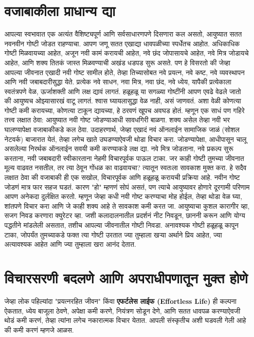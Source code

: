  \chapter{वजाबाकीला प्राधान्य द्या}
आपल्या स्वभावात एक अत्यंत वैशिष्ट्यपूर्ण आणि सर्वसाधारणपणे दिसणारा कल असतो, आयुष्यात सतत नवनवीन गोष्टी जोडत राहण्याचा.
 आपण जणू सतत एखाद्या धावपळीच्या स्पर्धेतच आहोत. अधिकाधिक गोष्टी मिळवायच्या आहेत, अजून नवी कामं करायची आहेत, नवे छंद जोपासायचे आहेत, नवे मित्र जोडायचे आहेत, आणि शक्य तितकं जास्त मिळवण्याची अखंड धडपड सुरू असते.
पण हे विसरतो की जेव्हा आपल्या जीवनात एखादी नवी गोष्ट सामील होते, तेव्हा तिच्यासोबत नवे प्रयत्न, नवे कष्ट, नवे व्यवस्थापन आणि नवी जबाबदारीसुद्धा येते.
 प्रत्येक नवे साधन, नवा मित्र, नवा छंद, नवे ध्येय, यापैकी प्रत्येकाला स्वतंत्रपणे वेळ, ऊर्जाशक्ती आणि लक्ष द्यावं लागतं. हळूहळू या सगळ्या गोष्टींनी आपण एवढे वेढले जातो की आयुष्यच ओझ्यासारखं वाटू लागतं.
 श्वास घ्यायलासुद्धा वेळ नाही, असं जाणवतं. अशा वेळी कोणत्या गोष्टी कमी करायच्या, कोणत्या टाकून द्यायच्या, हे ठरवणं खूपच अवघड होतं.
म्हणून एक साधं पण गहिरे तत्त्व लक्षात ठेवा: आयुष्यात नवी गोष्ट जोडण्याआधी सावधगिरी बाळगा. शक्य असेल तेव्हा नवी भर घालण्यापेक्षा वजाबाकीकडे कल ठेवा.
उदाहरणार्थ, जेव्हा एखादं नवं ऑनलाईन सामाजिक जाळं (सोशल नेटवर्क) बाजारात येतं, तेव्हा लगेच खाते उघडण्याऐवजी थोडा विचार करा.
 जोडण्यापेक्षा, आधीपासून चालू असलेल्या निरर्थक ऑनलाईन सवयी कमी करण्याकडे लक्ष द्या.
नवे मित्र जोडताना, नवे प्रकल्प सुरू करताना, नवी जबाबदारी स्वीकारताना नेहमी विचारपूर्वक पाऊल टाका.
 जर काही गोष्टी तुमच्या जीवनात मूल्य वाढवत नसतील, तर त्या ठेवून गोंधळ का वाढवायचा? त्यातून स्वतःला सावकाश मुक्त करा.
हे सदैव लक्षात ठेवा की वजाबाकी ही एक सखोल, विचारपूर्वक आणि हळूहळू करायची प्रक्रिया आहे.
 नवीन गोष्ट जोडणं मात्र फार सहज घडतं. कारण "हो" म्हणणं सोपं असतं, पण त्याचे आयुष्यावर होणारे दूरगामी परिणाम आपण अनेकदा दुर्लक्षित करतो.
 म्हणून जेव्हा कधी नवी गोष्ट करण्याचा मोह होईल, तेव्हा थोडा वेळ घ्या, शांतपणे विचार करा आणि जे काही शक्य आहे ते सावकाश कमी करत जा.
आयुष्याचा कुशल कारागीर व्हा, सजग निवड करणारा क्युरेटर व्हा.
 जशी कलादालनातील प्रदर्शनं नीट निवडून, छाननी करून आणि योग्य पद्धतीने मांडलेली असतात, तशीच आपल्या जीवनातील गोष्टी निवडा.
 अनावश्यक गोष्टी हळूहळू कापून टाका, जोपर्यंत तुमच्याकडे फक्त त्या गोष्टी उरतात ज्या तुम्हाला खऱ्या अर्थाने प्रिय आहेत, ज्या अत्यावश्यक आहेत आणि ज्या तुम्हाला खरा आनंद देतात.

 \chapter{विचारसरणी बदलणे आणि अपराधीपणातून मुक्त होणे}
जेव्हा लोक पहिल्यांदा "प्रयत्नरहित जीवन" किंवा \textbf{एफर्टलेस लाईफ (Effortless Life)} ही कल्पना ऐकतात, 
 ध्येय बाजूला ठेवणे, अपेक्षा कमी करणे, नियंत्रण सोडून देणे, आणि सतत धावपळ करण्याऐवजी थोडं कमी करणं, 
 तेव्हा त्यांना लगेच नकारात्मक विचार येतात. आपली संस्कृतीच अशी घडवली गेली आहे की कमी करणं म्हणजे आळस.

